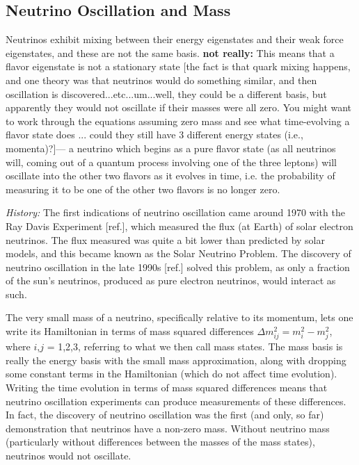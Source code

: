 \subsection{Neutrino Oscillation and Mass}

{\color{red}Neutrinos exhibit mixing between their energy eigenstates and their weak force eigenstates, and these are not the same basis. }  {\color{red}\textbf{not really:}  This means that a flavor eigenstate is not a stationary state} {\color{gray}[the fact is that quark mixing happens, and one theory was that neutrinos would do something similar, and then oscillation is discovered...etc...um...well, they could be a different basis, but apparently they would not oscillate if their masses were all zero. You might want to work through the equations assuming zero mass and see what time-evolving a flavor state does ... could they still have 3 different energy states (i.e., momenta)?]--- }a neutrino which begins as a pure flavor state (as all neutrinos will, coming out of a quantum process involving one of the three leptons) will oscillate into the other two flavors as it evolves in time, i.e. the probability of measuring it to be one of the other two flavors is no longer zero.

{\color{gray}\emph{History:  }The first indications of neutrino oscillation came around 1970 with the Ray Davis Experiment [ref.], which measured the flux (at Earth) of solar electron neutrinos.  The flux measured was quite a bit lower than predicted by solar models, and this became known as the Solar Neutrino Problem.  The discovery of neutrino oscillation in the late 1990s [ref.] solved this problem, as only a fraction of the sun's neutrinos, produced as pure electron neutrinos, would interact as such.}

The very small mass of a neutrino, specifically relative to its momentum, lets one write its Hamiltonian in terms of mass squared differences $\Delta m_{ij}^{2} = m_{i}^{2} - m_{j}^{2}$, where $i$,$j$ = 1,2,3, referring to what we then call mass states.  The mass basis is really the energy basis with the small mass approximation, along with dropping some constant terms in the Hamiltonian (which do not affect time evolution).  Writing the time evolution in terms of mass squared differences means that neutrino oscillation experiments can produce measurements of these differences.  In fact, the discovery of neutrino oscillation was the first (and only, so far) demonstration that neutrinos have a non-zero mass.  Without neutrino mass (particularly without differences between the masses of the mass states), neutrinos would not oscillate.

